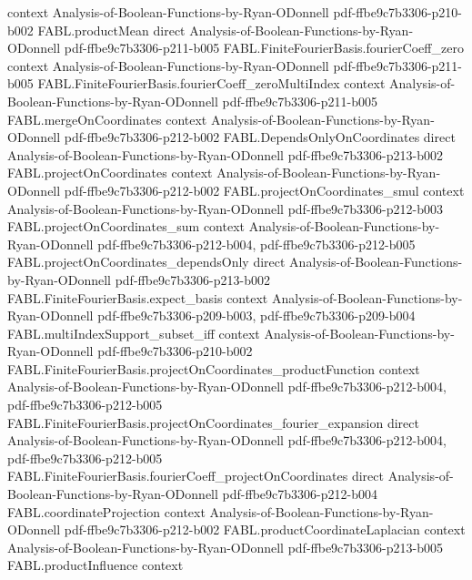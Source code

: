 \begin{theorem}
  {context}
  {Analysis-of-Boolean-Functions-by-Ryan-ODonnell}
  {pdf-ffbe9c7b3306-p210-b002}
\proofstep
  {FABL.productMean}
  {direct}
  {Analysis-of-Boolean-Functions-by-Ryan-ODonnell}
  {pdf-ffbe9c7b3306-p211-b005}
\proofstep
  {FABL.FiniteFourierBasis.fourierCoeff_zero}
  {context}
  {Analysis-of-Boolean-Functions-by-Ryan-ODonnell}
  {pdf-ffbe9c7b3306-p211-b005}
\proofstep
  {FABL.FiniteFourierBasis.fourierCoeff_zeroMultiIndex}
  {context}
  {Analysis-of-Boolean-Functions-by-Ryan-ODonnell}
  {pdf-ffbe9c7b3306-p211-b005}
\proofstep
  {FABL.mergeOnCoordinates}
  {context}
  {Analysis-of-Boolean-Functions-by-Ryan-ODonnell}
  {pdf-ffbe9c7b3306-p212-b002}
\proofstep
  {FABL.DependsOnlyOnCoordinates}
  {direct}
  {Analysis-of-Boolean-Functions-by-Ryan-ODonnell}
  {pdf-ffbe9c7b3306-p213-b002}
\proofstep
  {FABL.projectOnCoordinates}
  {context}
  {Analysis-of-Boolean-Functions-by-Ryan-ODonnell}
  {pdf-ffbe9c7b3306-p212-b002}
\proofstep
  {FABL.projectOnCoordinates_smul}
  {context}
  {Analysis-of-Boolean-Functions-by-Ryan-ODonnell}
  {pdf-ffbe9c7b3306-p212-b003}
\proofstep
  {FABL.projectOnCoordinates_sum}
  {context}
  {Analysis-of-Boolean-Functions-by-Ryan-ODonnell}
  {pdf-ffbe9c7b3306-p212-b004,
    pdf-ffbe9c7b3306-p212-b005}
\proofstep
  {FABL.projectOnCoordinates_dependsOnly}
  {direct}
  {Analysis-of-Boolean-Functions-by-Ryan-ODonnell}
  {pdf-ffbe9c7b3306-p213-b002}
\proofstep
  {FABL.FiniteFourierBasis.expect_basis}
  {context}
  {Analysis-of-Boolean-Functions-by-Ryan-ODonnell}
  {pdf-ffbe9c7b3306-p209-b003,
    pdf-ffbe9c7b3306-p209-b004}
\proofstep
  {FABL.multiIndexSupport_subset_iff}
  {context}
  {Analysis-of-Boolean-Functions-by-Ryan-ODonnell}
  {pdf-ffbe9c7b3306-p210-b002}
\proofstep
  {FABL.FiniteFourierBasis.projectOnCoordinates_productFunction}
  {context}
  {Analysis-of-Boolean-Functions-by-Ryan-ODonnell}
  {pdf-ffbe9c7b3306-p212-b004,
    pdf-ffbe9c7b3306-p212-b005}
\proofstep
  {FABL.FiniteFourierBasis.projectOnCoordinates_fourier_expansion}
  {direct}
  {Analysis-of-Boolean-Functions-by-Ryan-ODonnell}
  {pdf-ffbe9c7b3306-p212-b004,
    pdf-ffbe9c7b3306-p212-b005}
\proofstep
  {FABL.FiniteFourierBasis.fourierCoeff_projectOnCoordinates}
  {direct}
  {Analysis-of-Boolean-Functions-by-Ryan-ODonnell}
  {pdf-ffbe9c7b3306-p212-b004}
\proofstep
  {FABL.coordinateProjection}
  {context}
  {Analysis-of-Boolean-Functions-by-Ryan-ODonnell}
  {pdf-ffbe9c7b3306-p212-b002}
\proofstep
  {FABL.productCoordinateLaplacian}
  {context}
  {Analysis-of-Boolean-Functions-by-Ryan-ODonnell}
  {pdf-ffbe9c7b3306-p213-b005}
\proofstep
  {FABL.productInfluence}
  {context}

\end{theorem}
